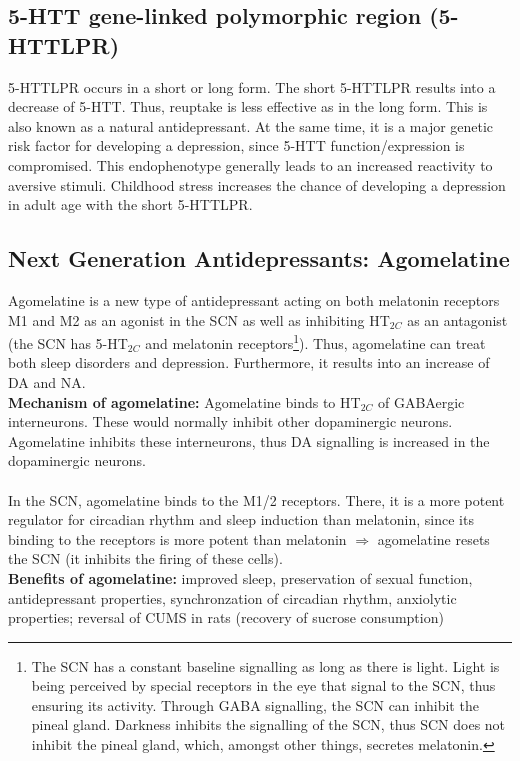 \documentclass[twosided, a4paper, pt11]{article}
\begin{document}
	\subsection{5-HTT gene-linked polymorphic region (5-HTTLPR)}
	5-HTTLPR occurs in a short or long form. The short 5-HTTLPR results into a decrease of 5-HTT. Thus, reuptake is less effective as in the long form. This is also known as a natural antidepressant. At the same time, it is a major genetic risk factor for developing a depression, since 5-HTT function/expression is compromised. This endophenotype generally leads to an increased reactivity to aversive stimuli. Childhood stress increases the chance of developing a depression in adult age with the short 5-HTTLPR.
	\subsection{Next Generation Antidepressants: Agomelatine}
	Agomelatine is a new type of antidepressant acting on both melatonin receptors M1 and M2 as an agonist in the SCN as well as inhibiting HT$_{2C}$ as an antagonist (the SCN has 5-HT$_{2C}$ and melatonin receptors\footnote{The SCN has a constant baseline signalling as long as there is light. Light is being perceived by special receptors in the eye that signal to the SCN, thus ensuring its activity. Through GABA signalling, the SCN can inhibit the pineal gland. Darkness inhibits the signalling of the SCN, thus SCN does not inhibit the pineal gland, which, amongst other things, secretes melatonin.}). Thus, agomelatine can treat both sleep disorders and depression. Furthermore, it results into an increase of DA and NA.\\
	\textbf{Mechanism of agomelatine: }Agomelatine binds to HT$_{2C}$ of GABAergic interneurons. These would normally inhibit other dopaminergic neurons. Agomelatine inhibits these interneurons, thus DA signalling is increased in the dopaminergic neurons.
	\paragraph{} In the SCN, agomelatine binds to the M1/2 receptors. There, it is a more potent regulator for circadian rhythm and sleep induction than melatonin, since its binding to the receptors is more potent than melatonin $\Rightarrow$ agomelatine resets the SCN (it inhibits the firing of these cells).\\
	\textbf{Benefits of agomelatine: }improved sleep, preservation of sexual function, antidepressant properties, synchronzation of circadian rhythm, anxiolytic properties; reversal of CUMS in rats (recovery of sucrose consumption)
	
\end{document}
